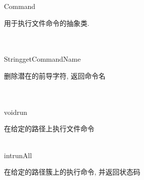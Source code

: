 \begin{XeClass}{Command}
   
 用于执行文件命令的抽象类.

  \begin{XeMethod}{\XeAbstract\\ \XePublic\\ }{String}{getCommandName}
       
 删除潜在的前导字符, 返回命令名 

  \end{XeMethod}

  \begin{XeMethod}{\XeAbstract\\ \XeProtected\\ }{void}{run}
       
 在给定的路径上执行文件命令

  \end{XeMethod}

  \begin{XeMethod}{\XePublic\\ }{int}{runAll}
       
 在给定的路径簇上的执行命令, 并返回状态码

  \end{XeMethod}

\end{XeClass}
